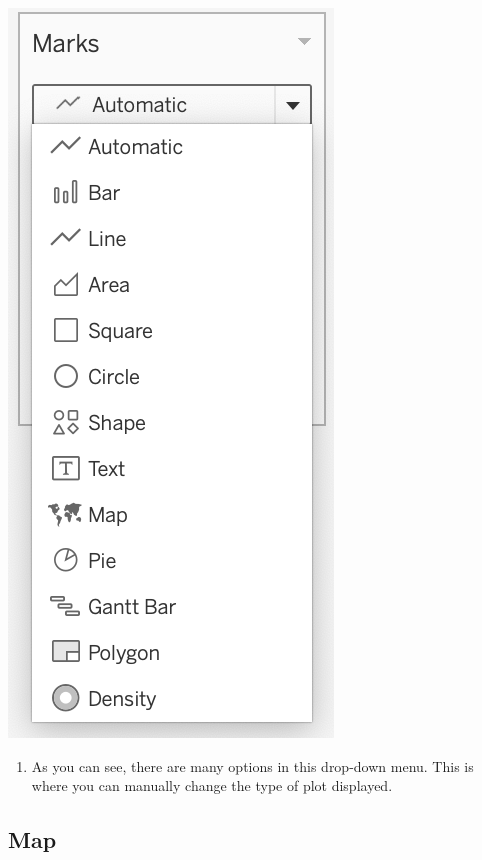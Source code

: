 \documentclass[
]{book}
\providecommand{\tightlist}{%
  \setlength{\itemsep}{0pt}\setlength{\parskip}{0pt}}
\begin{document}
\includegraphics{images/M3S2_Plot-types.png}

\begin{enumerate}
\def\labelenumi{\arabic{enumi}.}
\setcounter{enumi}{1}
\tightlist
\item
  As you can see, there are many options in this drop-down menu. This is where you can manually change the type of plot displayed.
\end{enumerate}

\hypertarget{map}{%
\subsection{Map}\label{map}}
\end{document}
